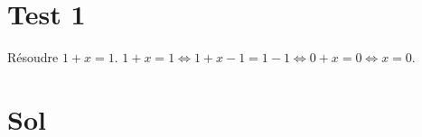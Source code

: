 \documentclass{article}
\newcommand{\solutionslist}{}
\begin{document}
\section{Test 1}

\begin{exercice}
	Résoudre $1+x=1$.
	\tcblower
	$1+x=1\iff 1+x-1=1-1\iff 0+x=0\iff x=0$.
\end{exercice}

\section{Sol}

\solutionslist
\end{document}
